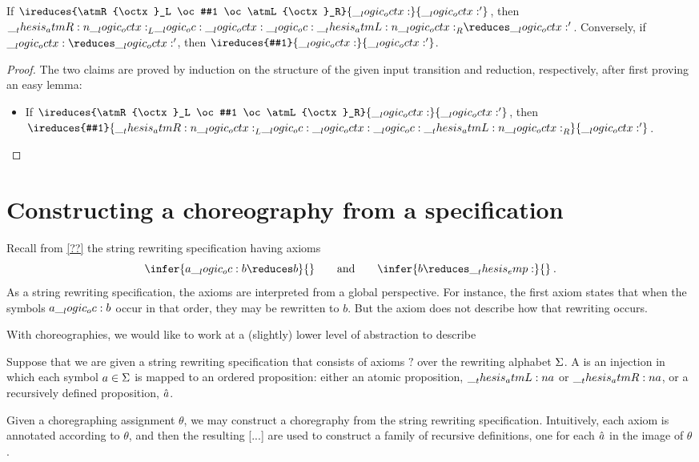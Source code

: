 \begin{theorem}
  If $\ireduces{\atmR{\octx}_L \oc #1 \oc \atmL{\octx}_R}{\octx}{\octx'}$, then $\atmR{\octx}_L \oc \octx \oc \atmL{\octx}_R \reduces \octx'$.
  Conversely, if $\octx \reduces \octx'$, then $\ireduces{#1}{\octx}{\octx'}$.
\end{theorem}
\begin{proof}
  The two claims are proved by induction on the structure of the given input transition and reduction, respectively, after first proving an easy lemma:
  \begin{itemize}
  \item If $\ireduces{\atmR{\octx}_L \oc #1 \oc \atmL{\octx}_R}{\octx}{\octx'}$, then $\ireduces{#1}{\atmR{\octx}_L \oc \octx \oc \atmL{\octx}_R}{\octx'}$.
  \qedhere
  \end{itemize}
\end{proof}

\section{Constructing a choreography from a specification}

Recall from \cref{??} the string rewriting specification having axioms
\begin{equation*}
  \infer{a \oc b \reduces b}{}
  \qquad\text{and}\qquad
  \infer{b \reduces \emp}{}
  \:.
\end{equation*}
As a string rewriting specification, the axioms are interpreted from a global perspective.
For instance, the first axiom states that when the symbols $a \__logic_oc: b$ occur in that order, they may be rewritten to $b$.
But the axiom does not describe how that rewriting occurs.

With choreographies, we would like to work at a (slightly) lower level of abstraction to describe 


Suppose that we are given a string rewriting specification that consists of axioms $?$ over the rewriting alphabet $\Sigma$.
A  is an injection in which each symbol $a \in \Sigma$ is mapped to an ordered proposition: either an atomic proposition, $\__thesis_atmL:n {a}$ or $\__thesis_atmR:n {a}$, or a recursively defined proposition, $\hat{a}$.

Given a choregraphing assignment $\theta$, we may construct a choregraphy from the string rewriting specification.
Intuitively, each axiom is annotated according to $\theta$, and then the resulting [...] are used to construct a family of recursive definitions, one for each $\hat{a}$ in the image of $\theta$.

